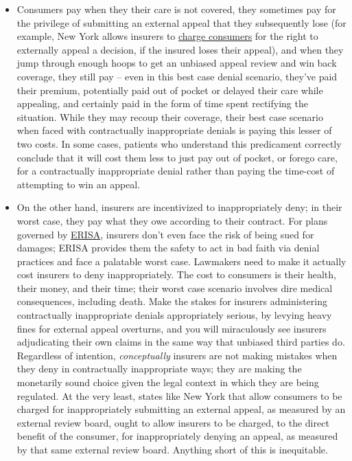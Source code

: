 \documentclass[12pt, a4paper,twoside]{report}
\theoremstyle{plain} %
\theoremstyle{definition} %
\theoremstyle{remark} %
\numberwithin{equation}{chapter}
\begin{document}
		\begin{itemize}
			\item Consumers pay when they their care is not covered, they sometimes pay for the privilege of submitting an external appeal that they subsequently lose (for example, New York allows insurers to \href{https://www.dfs.ny.gov/complaints/file_external_appeal}{charge consumers} for the right to externally appeal a decision, if the insured loses their appeal), and when they jump through enough hoops to get an unbiased appeal review and win back coverage, they still pay -- even in this best case denial scenario, they've paid their premium, potentially paid out of pocket or delayed their care while appealing, and certainly paid in the form of time spent rectifying the situation. While they may recoup their coverage, their best case scenario when faced with contractually inappropriate denials is paying this lesser of two costs. In some cases, patients who understand this predicament correctly conclude that it will cost them less to just pay out of pocket, or forego care, for a contractually inappropriate denial rather than paying the time-cost of attempting to win an appeal.
			
			\item On the other hand, insurers are incentivized to inappropriately deny; in their worst case, they pay what they owe according to their contract. For plans governed by \href{https://www.dol.gov/agencies/ebsa/laws-and-regulations/laws/erisa}{ERISA}, insurers don't even face the risk of being sued for damages; ERISA provides them the safety to act in bad faith via denial practices and face a palatable worst case. Lawmakers need to make it actually cost insurers to deny inappropriately. The cost to consumers is their health, their money, and their time; their worst case scenario involves dire medical consequences, including death. Make the stakes for insurers administering contractually inappropriate denials appropriately serious, by levying heavy fines for external appeal overturns, and you will miraculously see insurers adjudicating their own claims in the same way that unbiased third parties do. Regardless of intention, \emph{conceptually} insurers are not making mistakes when they deny in contractually inappropriate ways; they are making the monetarily sound choice given the legal context in which they are being regulated. At the very least, states like New York that allow consumers to be charged for inappropriately submitting an external appeal, as measured by an external review board, ought to allow insurers to be charged, to the direct benefit of the consumer, for inappropriately denying an appeal, as measured by that same external review board. Anything short of this is inequitable.
		\end{itemize}
		
\end{document}
